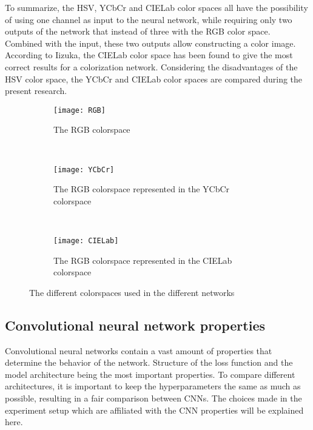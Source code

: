 To summarize, the HSV, YCbCr and CIELab color spaces all have the possibility of using one channel as input to the neural network, while requiring only two outputs of the network that instead of three with the RGB color space. Combined with the input, these two outputs allow constructing a color image. According to Iizuka, the CIELab color space has been found to give the most correct results for a colorization network\cite{IizukaSIGGRAPH2016}. Considering the disadvantages of the HSV color space, the YCbCr and CIELab color spaces are compared during the present research.

\begin{figure}
	\centering
	\begin{subfigure}[b]{0.32\textwidth}
		\texttt{[image: RGB]}
		\caption{The RGB colorspace}
		\label{fig:RGB}
	\end{subfigure}
	~ %
	\begin{subfigure}[b]{0.32\textwidth}
		\texttt{[image: YCbCr]}
		\caption{The RGB colorspace represented in the YCbCr colorspace}
		\label{fig:YCbCr}
	\end{subfigure}
	~ %
	\begin{subfigure}[b]{0.32\textwidth}
		\texttt{[image: CIELab]}
		\caption{The RGB colorspace represented in the CIELab colorspace}
		\label{fig:CIELab}
	\end{subfigure}
	\caption{The different colorspaces used in the different networks}\label{fig:animals}
\end{figure}

\subsection{Convolutional neural network properties}
\label{sec:nnproperties}

Convolutional neural networks contain a vast amount of properties that determine the behavior of the network. Structure of the loss function and the model architecture being the most important properties. To compare different architectures, it is important to keep the hyperparameters the same as much as possible, resulting in a fair comparison between CNNs. The choices made in the experiment setup which are affiliated with the CNN properties will be explained here.

